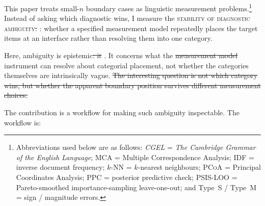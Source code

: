 \documentclass[12pt]{article}
\providecommand{\term}[1]{\textsc{#1}}
\providecommand{\abbr}[1]{\textsc{#1}}
\providecommand{\DIFaddtex}[1]{{\protect\color{DIFgreen}#1}} %
\providecommand{\DIFdeltex}[1]{{\protect\color{red}\sout{#1}}}                      %
\providecommand{\DIFaddbegin}{} %
\providecommand{\DIFaddend}{} %
\providecommand{\DIFdelbegin}{} %
\providecommand{\DIFdelend}{} %
\providecommand{\DIFadd}[1]{\texorpdfstring{\DIFaddtex{#1}}{#1}} %
\providecommand{\DIFdel}[1]{\texorpdfstring{\DIFdeltex{#1}}{}} %
\newcommand{\DIFscaledelfig}{0.5}
\newlength{\DIFdelgraphicswidth} %
\newlength{\DIFdelgraphicsheight} %
\newcommand{\DIFaddincludegraphics}[2][]{{\color{DIFgreen}\fbox{\DIFOincludegraphics[#1]{#2}}}} %
\newcommand{\DIFdelincludegraphics}[2][]{%
\sbox{\DIFdelgraphicsbox}{\DIFOincludegraphics[#1]{#2}}%
\settoboxwidth{\DIFdelgraphicswidth}{\DIFdelgraphicsbox} %
\settoboxtotalheight{\DIFdelgraphicsheight}{\DIFdelgraphicsbox} %
\scalebox{\DIFscaledelfig}{%
\parbox[b]{\DIFdelgraphicswidth}{\usebox{\DIFdelgraphicsbox}\\[-\baselineskip] \rule{\DIFdelgraphicswidth}{0em}}\llap{\resizebox{\DIFdelgraphicswidth}{\DIFdelgraphicsheight}{%
\setlength{\unitlength}{\DIFdelgraphicswidth}%
\begin{picture}(1,1)%
\thicklines\linethickness{2pt} %
{\color[rgb]{1,0,0}\put(0,0){\framebox(1,1){}}}%
{\color[rgb]{1,0,0}\put(0,0){\line( 1,1){1}}}%
{\color[rgb]{1,0,0}\put(0,1){\line(1,-1){1}}}%
\end{picture}%
}\hspace*{3pt}}} %
} %
\DeclareRobustCommand{\DIFaddbegin}{\DIFOaddbegin \let\includegraphics\DIFaddincludegraphics} %
\DeclareRobustCommand{\DIFaddend}{\DIFOaddend \let\includegraphics\DIFOincludegraphics} %
\DeclareRobustCommand{\DIFdelbegin}{\DIFOdelbegin \let\includegraphics\DIFdelincludegraphics} %
\DeclareRobustCommand{\DIFdelend}{\DIFOaddend \let\includegraphics\DIFOincludegraphics} %
\begin{document}
\DIFadd{This paper treats small-$n$ boundary cases as linguistic measurement problems.}\footnote{\DIFadd{Abbreviations used below are as follows: }\textit{\DIFadd{CGEL}} \DIFadd{= }\textit{\DIFadd{The Cambridge Grammar of the English Language}}\DIFadd{; \abbr{MCA} = Multiple Correspondence Analysis; \abbr{IDF} = inverse document frequency; $k$-\abbr{NN} = $k$-nearest neighbours; \abbr{PCoA} = Principal Coordinates Analysis; \abbr{PPC} = posterior predictive check; \abbr{PSIS-LOO} = Pareto-smoothed importance-sampling leave-one-out; and Type~S / Type~M = sign / magnitude errors.}} \DIFadd{Instead of asking which diagnostic wins}\DIFaddend , I measure the \term{stability of diagnostic ambiguity}\DIFdelbegin \DIFdel{. }\DIFdelend \DIFaddbegin \DIFadd{: whether a specified measurement model repeatedly places the target items at an interface rather than resolving them into one category.
}

\DIFaddend Here, ambiguity is epistemic\DIFdelbegin \DIFdel{: it }\DIFdelend \DIFaddbegin \DIFadd{. It }\DIFaddend concerns what the \DIFdelbegin \DIFdel{measurement model }\DIFdelend \DIFaddbegin \DIFadd{instrument }\DIFaddend can resolve about categorial placement, not whether the categories themselves are intrinsically vague.
\DIFdelbegin \DIFdel{The interesting question is not which category wins, but whether the apparent boundary position survives different measurement choices.
}\DIFdelend \DIFaddbegin 

\DIFadd{The contribution is a workflow for making such ambiguity inspectable. The workflow is:
}\DIFaddend 
\end{document}
